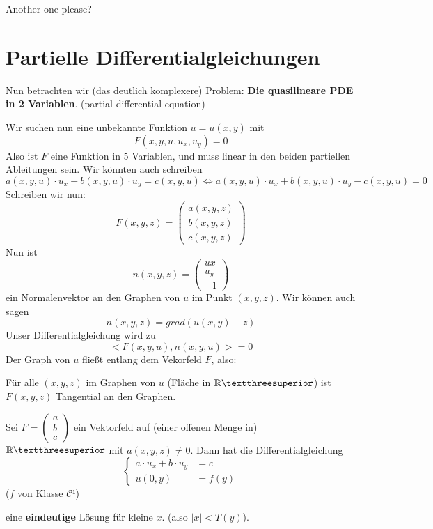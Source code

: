 \documentclass[main.tex]{subfiles}
\begin{document}
Another one please?


\section{Partielle Differentialgleichungen}

Nun betrachten wir (das deutlich komplexere) Problem: \textbf{Die quasilineare PDE in 2 Variablen}. (partial differential equation)

Wir suchen nun eine unbekannte Funktion $u = u(x,y)$ mit
$$F(x,y,u,u_x,u_y) = 0$$
Also ist $F$ eine Funktion in 5 Variablen, und muss linear in den beiden partiellen Ableitungen sein. Wir könnten auch schreiben
$$a(x,y,u) \cdot u_x + b(x,y,u) \cdot u_y = c(x,y,u) \Leftrightarrow a(x,y,u) \cdot u_x + b(x,y,u) \cdot u_y - c(x,y,u) = 0$$
Schreiben wir nun:
$$F(x,y,z) = \begin{pmatrix}
  a(x,y,z) \\ b(x,y,z) \\ c(x,y,z)
\end{pmatrix}$$
Nun ist
$$n(x,y,z) = \begin{pmatrix}
  ux \\ u_y \\ -1
\end{pmatrix}$$
ein Normalenvektor an den Graphen von $u$ im Punkt $(x,y,z)$. Wir können auch sagen
$$n(x,y,z) = grad(u(x,y) - z)$$
Unser Differentialgleichung wird zu
$$<F(x,y,u),n(x,y,u)> = 0$$
Der Graph von $u$ fließt entlang dem Vekorfeld $F$, also:

Für alle $(x,y,z)$ im Graphen von $u$ (Fläche in $\R³$) ist $F(x,y,z)$ Tangential an den Graphen.


\begin{Theorem}
  Sei $F = \left(\begin{smallmatrix}
    a \\ b \\ c
  \end{smallmatrix}\right)$ ein Vektorfeld auf (einer offenen Menge in) $\R³$ mit $a(x,y,z) \neq 0$. Dann hat die Differentialgleichung
  $$\left\{\begin{aligned}
    a \cdot u_x + b \cdot u_y & = c \\
    u(0,y) & = f(y)
  \end{aligned}\right.$$
  ($f$ von Klasse $\mathcal{C}¹$)

  eine \textbf{eindeutige} Lösung für kleine $x$. (also $|x| < T(y)$).
\end{Theorem}
\end{document}
